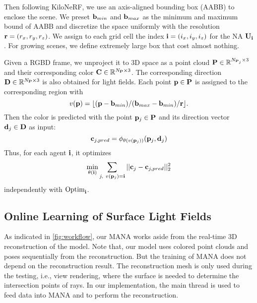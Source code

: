 Then following KiloNeRF, we use an axis-aligned bounding box (AABB) to enclose the scene. We preset $\mathbf b_{min}$ and $\mathbf b_{max}$ as the minimum and maximum bound of AABB and discretize the space uniformly with the resolution $\mathbf r=(r_x,r_y,r_z)$. We assign to each grid cell the index $\mathbf i=(i_x,i_y,i_z)$ for the NA $\mathbf{U}_{\mathbf i}$. For growing scenes, we define extremely large box that cost almost nothing.

Given a RGBD frame, we unproject it to 3D space as a point cloud $\mathbf P\in \mathbb{R}^{N_{\mathbf P_j}\times 3}$ and their corresponding color $\mathbf C\in \mathbb{R}^{N_{\mathbf P}\times 3}$. The corresponding direction $\mathbf D\in \mathbb{R}^{N_{\mathbf P}\times 3}$ is also obtained for light fields.
%
Each point $\mathbf p \in \mathbf P$ is assigned to the corresponding region with 
\begin{equation}
v(\mathbf p) = \lfloor (\mathbf p - \mathbf b_{min}) / (\mathbf b_{max}-\mathbf b_{min}) / \mathbf r \rfloor.
\end{equation}
%
Then the color is predicted with the point $\mathbf p_j \in \mathbf P$ and its direction vector $\mathbf d_j \in \mathbf D$ as input:
\begin{equation}
\mathbf c_{j,pred} = \phi_{\theta(v(\mathbf p_j))}(\mathbf p_j, \mathbf d_j)
\label{eq:pred}
\end{equation}
Thus, for each agent $\mathbf i$, it optimizes 
\begin{equation}
\min_{\theta(\mathbf i)} \sum_{j,\ v(\mathbf p_j)=\mathbf i} || \mathbf c_j -\mathbf c_{j,pred}   ||^2_2
\end{equation}
independently with $\text{Optim}_{\mathbf i}$.
\vspace{-.3cm}
\subsection{Online Learning of Surface Light Fields}
As indicated in \cref{fig:workflow}, our MANA works aside from the real-time 3D reconstruction of the model.
Note that, our model uses colored point clouds and poses sequentially from the reconstruction. 
But the training of MANA does not depend on the reconstruction result. 
The reconstruction mesh is only used during the testing, i.e., view rendering, where the surface is needed to determine the intersection points of rays.
In our implementation, the main thread is used to feed data into MANA and to perform the reconstruction.

